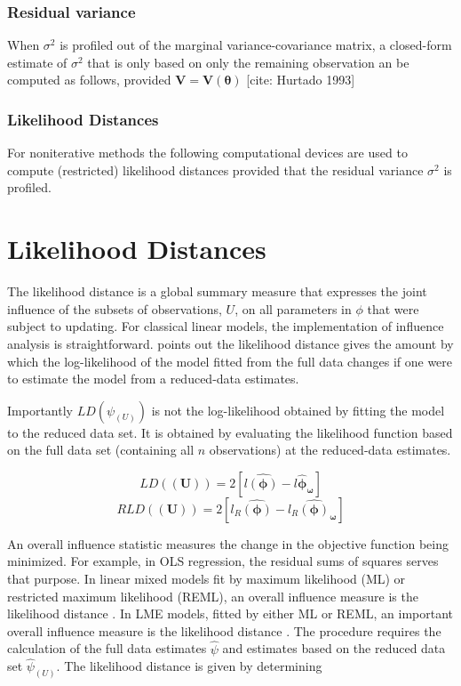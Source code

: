 \documentclass[12pt, a4paper]{report}
\theoremstyle{plain}
\theoremstyle{definition}
\theoremstyle{remark}
\begin{document}
\subsubsection{Residual variance}
When $\sigma^2$ is profiled out of the marginal variance-covariance matrix, a closed-form estimate of $\sigma^2$ that is only based on only the remaining observation
an be computed as follows, provided $\boldsymbol{V} = \boldsymbol{V}(\boldsymbol{\theta}) $
[cite: Hurtado 1993]

\subsubsection{Likelihood Distances}
For noniterative methods the following computational devices are used to compute (restricted) likelihood distances provided that the residual variance
$\sigma^2$ is profiled.




\section{Likelihood Distances}

The  likelihood distance is a global summary measure that expresses the joint influence of the subsets of observations, $U$, on all parameters in $\phi$ that were subject to updating. For classical linear models, the implementation of influence analysis is straightforward. \citet{schabenberger} points out the likelihood distance gives the amount by which the log-likelihood of the model fitted from the full data changes if one were
to estimate the model from a reduced-data estimates. 

Importantly $LD(\psi_{(U)})$ is not the log-likelihood obtained by fitting the model to the reduced data set. It is obtained by evaluating the likelihood function based on the full data set (containing all $n$ observations) at the reduced-data estimates.


\[  LD(\boldsymbol{(U)})= 2[l\boldsymbol{\hat{(\phi)}} - l\boldsymbol{\hat{\phi}_\omega} ] \]
\[  RLD(\boldsymbol{(U)})= 2[ l_R\boldsymbol{\hat{(\phi)}} - l_R\boldsymbol{\hat{(\phi)}_\omega} ] \]

An overall influence statistic measures the change in the objective function being minimized. For example, in
OLS regression, the residual sums of squares serves that purpose. In linear mixed models fit by
 maximum likelihood (ML) or  restricted maximum likelihood (REML), an overall influence measure is the  likelihood distance \citep{cook}. In LME models, fitted by either ML or REML, an important overall
influence measure is the likelihood distance \citep{cook82}. The  procedure requires the calculation of the full data estimates
$\hat{\psi}$ and estimates based on the reduced data set  $\hat{\psi}_{(U)}$. The likelihood distance is given by
determining
\end{document}
